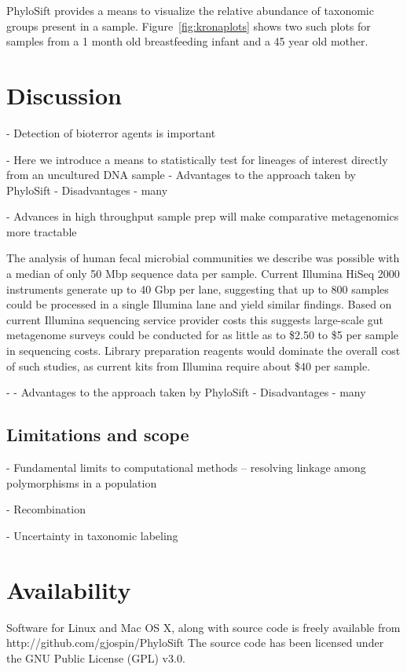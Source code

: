 \documentclass[10pt]{article}
\begin{document}
PhyloSift provides a means to visualize the relative abundance of taxonomic groups present in a sample.
Figure~\ref{fig:kronaplots} shows two such plots for samples from a 1 month old breastfeeding infant and a 45 year old mother.



\section*{Discussion}
- Detection of bioterror agents is important

- Here we introduce a means to statistically test for lineages of interest directly from an uncultured DNA sample
  - Advantages to the approach taken by PhyloSift
  - Disadvantages
    - many



- Advances in high throughput sample prep will make comparative metagenomics more tractable

The analysis of human fecal microbial communities we describe was possible with a median of only 50 Mbp sequence data per sample.
Current Illumina HiSeq 2000 instruments generate up to 40 Gbp per lane, suggesting that up to 800 samples could be processed in a single Illumina lane and yield similar findings.
Based on current Illumina sequencing service provider costs this suggests large-scale gut metagenome surveys could be conducted for as little as to \$2.50 to \$5 per sample in sequencing costs.
Library preparation reagents would dominate the overall cost of such studies, as current kits from Illumina require about \$40 per sample.

- 
  - Advantages to the approach taken by PhyloSift
  - Disadvantages
    - many


\subsection*{Limitations and scope}
  - Fundamental limits to computational methods -- resolving linkage among polymorphisms in a population

  - Recombination

  - Uncertainty in taxonomic labeling


\section*{Availability}
Software for Linux and Mac OS X, along with source code is freely available from http://github.com/gjospin/PhyloSift
The source code has been licensed under the GNU Public License (GPL) v3.0.
\end{document}
